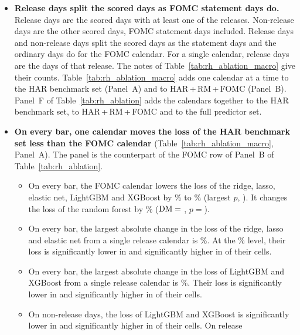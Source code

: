 \begin{itemize}
\begin{itemize}
  \end{itemize}
\item \textbf{Release days split the scored days as FOMC statement days do.} Release days are the \rhabNRelDays{} scored
  days with at least one of the
  releases. Non-release days are the other \rhabNNrelDays{} scored days, FOMC statement days included. Release days
  and non-release days split the scored days as the statement days and the ordinary days do for the FOMC calendar.
  For a single calendar, release days are the days of that release. The notes of Table~\ref{tab:rh_ablation_macro}
  give their counts.
  Table~\ref{tab:rh_ablation_macro} adds one calendar at a time to the HAR benchmark set (Panel~A) and to
  HAR\,+\,RM\,+\,FOMC (Panel~B). Panel~F of Table~\ref{tab:rh_ablation} adds the \rhabNMacReleases{} calendars
  together to the HAR benchmark set, to HAR\,+\,RM\,+\,FOMC and to the full predictor set.
\item \textbf{On every bar, one calendar moves the loss of the HAR benchmark set less than the FOMC calendar}
  (Table~\ref{tab:rh_ablation_macro}, Panel~A). The panel is
  the counterpart of the FOMC row of Panel~B of Table~\ref{tab:rh_ablation}.
  \begin{itemize}
  \item On every bar, the FOMC calendar lowers the loss of the ridge, lasso, elastic net, LightGBM and XGBoost by
    \rhmsFomcAllGainMin\% to \rhmsFomcAllGainMax\% (largest $p$, \rhmsFomcAllPMax). It changes the loss of the random
    forest by \rhabRfAddFomcAllPct\% ($\mathrm{DM} = {}$\rhabRfAddFomcAllDm, $p = {}$\rhabRfAddFomcAllP).
  \item On every bar, the largest absolute change in the loss of the ridge, lasso and elastic net from a single release
    calendar is \rhmsPanAAllPenMaxAbsPct\%. At the \rhmsSigLevel\% level, their loss is significantly lower in
    \rhmsPanAAllPenNSigLower{} and significantly higher in \rhmsPanAAllPenNSigHigher{} of their
    \rhmsPanAAllPenNCells{} cells.
  \item On every bar, the largest absolute change in the loss of LightGBM and XGBoost from a single release calendar
    is \rhmsPanAAllTreeMaxAbsPct\%. Their loss is significantly lower in \rhmsPanAAllTreeNSigLower{} and significantly
    higher in \rhmsPanAAllTreeNSigHigher{} of their \rhmsPanAAllTreeNCells{} cells.
  \item On non-release days, the loss of LightGBM and XGBoost is significantly lower in
    \rhmsPanANrelTreeNSigLower{} and significantly higher in \rhmsPanANrelTreeNSigHigher{} of their cells. On release

\end{itemize}
\end{itemize}
